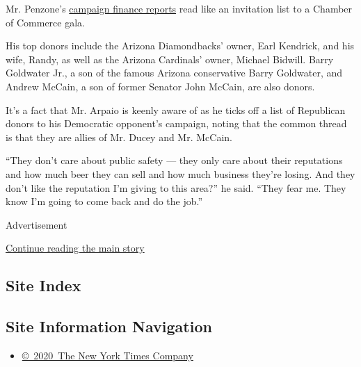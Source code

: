 Mr. Penzone's
\href{https://recorder.maricopa.gov/campaignfinance/campfinDocsresults.aspx?candidateid=1000885}{campaign
finance reports} read like an invitation list to a Chamber of Commerce
gala.

His top donors include the Arizona Diamondbacks' owner, Earl Kendrick,
and his wife, Randy, as well as the Arizona Cardinals' owner, Michael
Bidwill. Barry Goldwater Jr., a son of the famous Arizona conservative
Barry Goldwater, and Andrew McCain, a son of former Senator John McCain,
are also donors.

It's a fact that Mr. Arpaio is keenly aware of as he ticks off a list of
Republican donors to his Democratic opponent's campaign, noting that the
common thread is that they are allies of Mr. Ducey and Mr. McCain.

``They don't care about public safety --- they only care about their
reputations and how much beer they can sell and how much business
they're losing. And they don't like the reputation I'm giving to this
area?'' he said. ``They fear me. They know I'm going to come back and do
the job.''

Advertisement

\protect\hyperlink{after-bottom}{Continue reading the main story}

\hypertarget{site-index}{%
\subsection{Site Index}\label{site-index}}

\hypertarget{site-information-navigation}{%
\subsection{Site Information
Navigation}\label{site-information-navigation}}

\begin{itemize}
\tightlist
\item
  \href{https://help.nytimes3xbfgragh.onion/hc/en-us/articles/115014792127-Copyright-notice}{©~2020~The
  New York Times Company}
\end{itemize}

